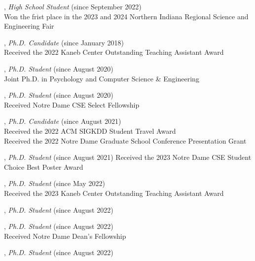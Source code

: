 \documentclass[10pt]{article}
\newenvironment{myindentpar}[1]%
{\begin{list}{}%
         {\setlength{\leftmargin}{#1}}%
         \item[]%
}
{\end{list}}
\newcounter{list}
\begin{document}
\begin{myindentpar}{0.75cm}

\hspace{-0.75cm}{\bf Albert Lu}, \textit{High School Student} (since September 2022) \\
	{Won the frist place in the 2023 and 2024 Northern Indiana Regional Science and Engineering Fair}
	
\hspace{-0.75cm}{\bf Qingkai Zeng}, \textit{Ph.D. Candidate} (since January 2018) \\
	{Received the 2022 Kaneb Center Outstanding Teaching Assistant Award}

\hspace{-0.75cm}{\bf Lingbo Tong}, \textit{Ph.D. Student} (since August 2020) \\
	{Joint Ph.D. in Psychology and Computer Science \& Engineering}

\hspace{-0.75cm}{\bf Mengxia Yu}, \textit{Ph.D. Student} (since August 2020) \\
	{Received Notre Dame CSE Select Fellowship}

\hspace{-0.75cm}{\bf Gang Liu}, \textit{Ph.D. Candidate} (since August 2021) \\
	{Received the 2022 ACM SIGKDD Student Travel Award} \\
	{Received the 2022 Notre Dame Graduate School Conference Presentation Grant}

\hspace{-0.75cm}{\bf Zhihan Zhang}, \textit{Ph.D. Student} (since August 2021)
	{Received the 2023 Notre Dame CSE Student Choice Best Poster Award}

\hspace{-0.75cm}{\bf Noah Ziems}, \textit{Ph.D. Student} (since May 2022) \\
	{Received the 2023 Kaneb Center Outstanding Teaching Assistant Award}

\hspace{-0.75cm}{\bf Hy Dang}, \textit{Ph.D. Student} (since August 2022)

\hspace{-0.75cm}{\bf Eric Inae}, \textit{Ph.D. Student} (since August 2022) \\
	{Received Notre Dame Dean's Fellowship}

\hspace{-0.75cm}{\bf Bang Nguyen}, \textit{Ph.D. Student} (since August 2022)


\end{myindentpar}
\end{document}
